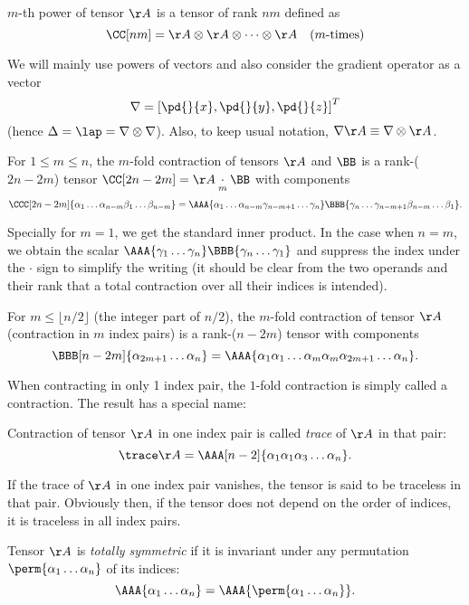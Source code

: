 \begin{definition}
  $m$-th power of tensor $\AA$ is a tensor of rank $nm$ defined as
  $$
    \CC[nm] = \AA\otimes\AA\otimes\cdots\otimes\AA\quad \mbox{($m$-times)}
  $$
\end{definition}
We will mainly use powers of vectors and also consider the gradient operator as a vector
$$
  \nabla = \left[\pd{}{x}, \pd{}{y}, \pd{}{z}\right]^T
$$
(hence $\Delta = \lap = \nabla\otimes\nabla$). Also, to keep usual notation, $\nabla\AA \equiv \nabla\otimes\AA$.

\begin{definition}
  For $1\leq m \leq n$, the $m$-fold contraction of tensors $\AA$ and $\BB$ is a rank-($2n-2m$) tensor 
  $\CC[2n-2m] = \AA\underset{m}{\cdot}\BB$ with components
  $$
    \CCC[2n-2m]{\alpha_{1}\ldots\alpha_{n-m}\beta_1\ldots\beta_{n-m}} = 
    \AAA{\alpha_1\ldots\alpha_{n-m}\gamma_{n-m+1}\ldots\gamma_n}\BBB{\gamma_n\ldots\gamma_{n-m+1}\beta_{n-m}\ldots\beta_1}.
  $$
\end{definition}
Specially for $m = 1$, we get the standard inner product. 
In the case when $n = m$, we obtain the scalar $\AAA{\gamma_1\ldots\gamma_n}\BBB{\gamma_n\ldots\gamma_1}$ and 
suppress the index under the $\cdot$ sign to simplify the writing (it should be clear from the two operands and their 
rank that a total contraction over all their indices is intended). 

\begin{definition}
  For $m \leq \lfloor n/2 \rfloor$ (the integer part of $n/2$), the $m$-fold contraction of tensor $\AA$ (contraction 
  in $m$ index pairs) is a rank-($n-2m$) tensor with components
  $$
    \BBB[n-2m]{\alpha_{2m+1}\ldots\alpha_n} = \AAA{\alpha_1\alpha_1\ldots\alpha_m\alpha_m\alpha_{2m+1}\ldots\alpha_n}.
  $$
\end{definition}
When contracting in only 1 index pair, the $1$-fold contraction is simply called a contraction. The result has a special 
name:
\begin{definition}
  Contraction of tensor $\AA$ in one index pair is called \textit{trace} of $\AA$ in that pair:
  $$
    \trace \AA = \AAA[n-2]{\alpha_1\alpha_1\alpha_3\ldots\alpha_n}.
  $$ 
\end{definition}
If the trace of $\AA$ in one index pair vanishes, the tensor is said to be traceless in that pair. Obviously then, if 
the tensor does not depend on the order of indices, it is traceless in all index pairs.
\begin{definition}
  Tensor $\AA$ is \textit{totally symmetric} if it is invariant under any permutation $\perm{\alpha_1\ldots\alpha_n}$ 
  of its indices:
  $$
    \AAA{\alpha_1\ldots\alpha_n} = \AAA{\perm{\alpha_1\ldots\alpha_n}}.
  $$
\end{definition}

